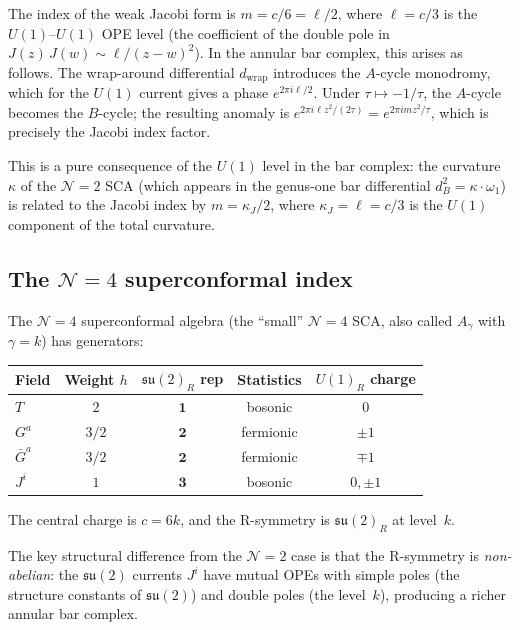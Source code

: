 \begin{remark}[The index $m = c/6$ from the $U(1)$
anomaly]%
\label{rem:jacobi-index-u1-anomaly}%
%
The index of the weak Jacobi form is
$m = c/6 = \ell/2$, where $\ell = c/3$ is the
$U(1)$--$U(1)$ OPE level (the coefficient of the
double pole in $J(z)\,J(w)\sim\ell/(z{-}w)^2$).
In the annular bar complex, this arises as follows.
The wrap-around differential $d_{\mathrm{wrap}}$
introduces the $A$-cycle monodromy, which for the
$U(1)$ current gives a phase $e^{2\pi i\ell/2}$.
Under $\tau\mapsto -1/\tau$, the $A$-cycle becomes the
$B$-cycle; the resulting anomaly is
$e^{2\pi i\ell z^2/(2\tau)} = e^{2\pi i m z^2/\tau}$,
which is precisely the Jacobi index factor.

This is a pure consequence of the $U(1)$
level in the bar complex: the curvature $\kappa$
of the $\mathcal N=2$ SCA (which appears in the
genus-one bar differential $d_B^2 = \kappa\cdot\omega_1$)
is related to the Jacobi index by
$m = \kappa_J/2$, where $\kappa_J = \ell = c/3$ is the
$U(1)$ component of the total curvature.
\end{remark}

\subsection{The $\mathcal{N}=4$ superconformal index}
\label{subsec:n4-superconformal-index}

The $\mathcal{N}=4$ superconformal algebra (the ``small''
$\mathcal{N}=4$ SCA, also called $A_\gamma$ with
$\gamma = k$) has generators:
\begin{center}
\renewcommand{\arraystretch}{1.15}
\begin{tabular}{lcccc}
\textbf{Field} & \textbf{Weight $h$}
& \textbf{$\mathfrak{su}(2)_R$ rep}
& \textbf{Statistics} & \textbf{$U(1)_R$ charge} \\
\hline
$T$ & $2$ & $\mathbf{1}$ & bosonic & $0$ \\
$G^a$ & $3/2$ & $\mathbf{2}$ & fermionic & $\pm 1$ \\
$\bar G^a$ & $3/2$ & $\mathbf{2}$ & fermionic & $\mp 1$ \\
$J^i$ & $1$ & $\mathbf{3}$ & bosonic & $0,\pm 1$
\end{tabular}
\end{center}
The central charge is $c = 6k$, and the R-symmetry is
$\mathfrak{su}(2)_R$ at level~$k$.

The key structural difference from the $\mathcal N=2$
case is that the R-symmetry is \emph{non-abelian}: the
$\mathfrak{su}(2)$ currents $J^i$ have mutual OPEs
with simple poles (the structure constants of
$\mathfrak{su}(2)$) and double poles (the level~$k$),
producing a richer annular bar complex.

